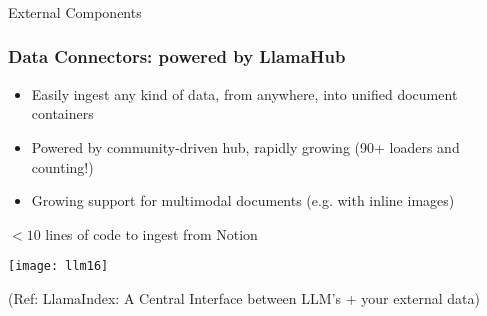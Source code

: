 		



\begin{frame}[fragile]\frametitle{}
\begin{center}
{\Large External Components}
\end{center}
\end{frame}


\begin{frame}[fragile]\frametitle{Data Connectors: powered by LlamaHub}


\begin{itemize}
\item Easily ingest any kind of data, from anywhere, into unified document containers 
\item Powered by community-driven hub, rapidly growing (90+ loaders and counting!)
\item Growing support for multimodal documents (e.g. with inline images)
\end{itemize}	

$<10$ lines of code to ingest from Notion

\begin{center}
\texttt{[image: llm16]}

{\tiny (Ref: LlamaIndex: A Central Interface between LLM's + your external data)}
\end{center}
\end{frame}

